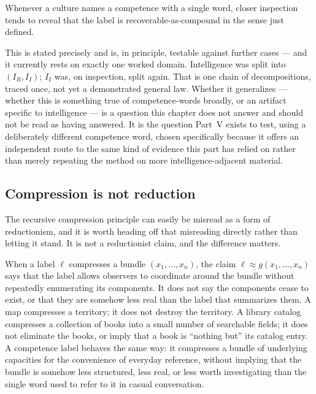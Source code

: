 \begin{conjecture}
Whenever a culture names a competence with a single word, closer inspection tends to reveal that the label is recoverable-as-compound in the sense just defined.
\end{conjecture}

This is stated precisely and is, in principle, testable against further cases --- and it currently rests on exactly one worked domain. Intelligence was split into $(I_R, I_I)$; $I_I$ was, on inspection, split again. That is one chain of decompositions, traced once, not yet a demonstrated general law. Whether it generalizes --- whether this is something true of competence-words broadly, or an artifact specific to intelligence --- is a question this chapter does not answer and should not be read as having answered. It is the question Part~V exists to test, using a deliberately different competence word, chosen specifically because it offers an independent route to the same kind of evidence this part has relied on rather than merely repeating the method on more intelligence-adjacent material.

\subsection*{Compression is not reduction}

The recursive compression principle can easily be misread as a form of reductionism, and it is worth heading off that misreading directly rather than letting it stand. It is not a reductionist claim, and the difference matters.

When a label $\ell$ compresses a bundle $(x_1, \ldots, x_n)$, the claim $\ell \approx g(x_1,\ldots,x_n)$ says that the label allows observers to coordinate around the bundle without repeatedly enumerating its components. It does not say the components cease to exist, or that they are somehow less real than the label that summarizes them. A map compresses a territory; it does not destroy the territory. A library catalog compresses a collection of books into a small number of searchable fields; it does not eliminate the books, or imply that a book is ``nothing but'' its catalog entry. A competence label behaves the same way: it compresses a bundle of underlying capacities for the convenience of everyday reference, without implying that the bundle is somehow less structured, less real, or less worth investigating than the single word used to refer to it in casual conversation.

